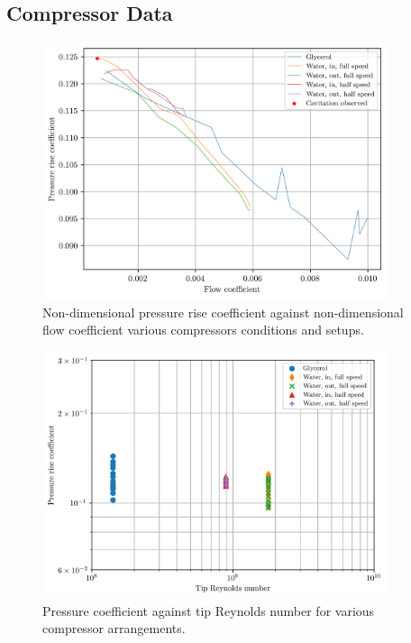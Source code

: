 \documentclass{article}
\begin{document}
\subsection{Compressor Data}

\begin{figure}[H]
    \centering
    \includegraphics[width=0.9\textwidth]{compressor_non_dims.png}
    \caption{Non-dimensional pressure rise coefficient against non-dimensional flow coefficient various compressors conditions and setups.}
    \label{fig:compressor_non_dims}
\end{figure}

\begin{figure}[H]
    \centering
    \includegraphics[width=0.9\textwidth]{pressure_reynolds.png}
    \caption{Pressure coefficient against tip Reynolds number for various compressor arrangements.}
    \label{fig:compressor_pressure_re}
\end{figure}
\end{document}
